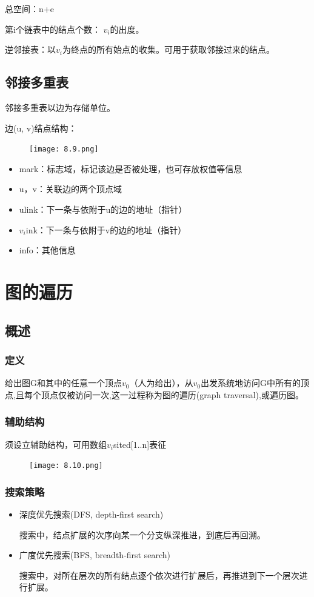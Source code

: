 \documentclass[AutoFakeBold]{LZUThesis2007}
\begin{document}
总空间：n+e

第i个链表中的结点个数： $v_{i}$的出度。

逆邻接表：以$v_{i}$为终点的所有始点的收集。可用于获取邻接过来的结点。
		\subsection{邻接多重表}
邻接多重表以边为存储单位。

边(u, v)结点结构：
\begin{figure}[H]
    \centering
    \texttt{[image: 8.9.png]}

\end{figure}
\begin{itemize}
	\item mark：标志域，标记该边是否被处理，也可存放权值等信息
	\item u，v：关联边的两个顶点域
	\item ulink：下一条与依附于u的边的地址（指针）
	\item $v_{i}$ink：下一条与依附于v的边的地址（指针）
	\item info：其他信息
\end{itemize}


	\section{图的遍历}
		\subsection{概述}
			\subsubsection{定义}
给出图G和其中的任意一个顶点$v_{0}$（人为给出），从$v_{0}$出发系统地访问G中所有的顶点,且每个顶点仅被访问一次,这一过程称为图的遍历(graph traversal),或遍历图。
			\subsubsection{辅助结构}
须设立辅助结构，可用数组$v_{i}$sited[1..n]表征
\begin{figure}[H]
    \centering
    \texttt{[image: 8.10.png]}

\end{figure}
			\subsubsection{搜索策略}
\begin{itemize}
	\item 深度优先搜索(DFS, depth-first search)

搜索中，结点扩展的次序向某一个分支纵深推进，到底后再回溯。
	\item 广度优先搜索(BFS, breadth-first search)

搜索中，对所在层次的所有结点逐个依次进行扩展后，再推进到下一个层次进行扩展。
\end{itemize}
\end{document}
